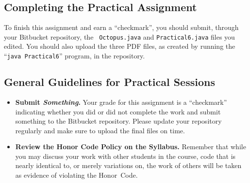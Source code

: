 \vspace*{-.3in}
\subsection*{Completing the Practical Assignment}
\vspace*{-.1in}

To finish this assignment and earn a ``checkmark'', you should submit, through your Bitbucket repository, the {\tt
  Octopus.java} and {\tt Practical6.java} files you edited. You should also upload the three PDF files, as created by
running the ``{\tt java Practical6}'' program, in the repository.

\vspace*{-.15in}
\subsection*{General Guidelines for Practical Sessions}
\vspace*{-.05in}
\begin{itemize}

\item {\bf Submit \textbf{\textit{Something}}.} Your grade for this assignment is a ``checkmark'' indicating whether you
  did or did not complete the work and submit something to the Bitbucket repository. Please update your repository
  regularly and make sure to upload the final files on time.


\item {\bf Review the Honor Code Policy on the Syllabus.} Remember that while you may discuss your work with other
  students in the course, code that is nearly identical to, or merely variations on, the work of others will be
  taken as evidence of violating the \mbox{Honor Code}.
\end{itemize}



